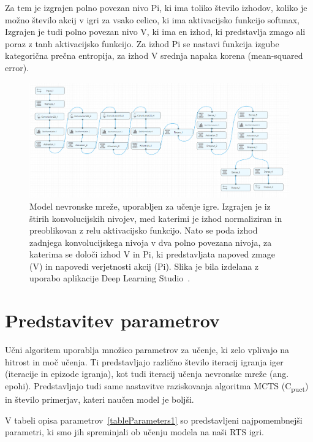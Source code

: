 \documentclass[a4paper, 12pt]{book}
\begin{document}
Za tem je izgrajen polno povezan nivo Pi, ki ima toliko število izhodov, koliko je možno število akcij v igri za vsako celico, ki ima aktivacijsko funkcijo softmax,
Izgrajen je tudi polno povezan nivo V, ki ima en izhod, ki predstavlja zmago ali poraz z tanh aktivacijsko funkcijo.
Za izhod Pi se nastavi funkcija izgube kategorična prečna entropija, za izhod V  srednja napaka korena (mean-squared error).

\begin{figure}[h]
	\begin{center}
		\includegraphics[width=1\textwidth]{photos/model_using_deepcognition.pdf}
	\end{center}
	\caption{Model nevronske mreže, uporabljen za učenje igre. Izgrajen je iz štirih konvolucijskih nivojev, med katerimi je izhod normaliziran in preoblikovan z relu aktivacijsko funkcijo. 
		Nato se poda izhod zadnjega konvolucijskega nivoja v dva polno povezana nivoja, za katerima se določi izhod V in Pi, ki predstavljata napoved zmage (V) in napovedi verjetnosti akcij (Pi).
		Slika je bila izdelana z uporabo aplikacije Deep Learning Studio~\cite{deepcognition}.}
	\label{vizualzacijaModela}
\end{figure}



\section{Predstavitev parametrov}
\label{parametri}
Učni algoritem uporablja množico parametrov za učenje, ki zelo vplivajo na hitrost in moč učenja.
Ti predstavljajo različno število iteracij igranja iger (iteracije in epizode igranja), kot tudi iteracij učenja nevronske mreže (ang. epohi).
Predstavljajo tudi same nastavitve raziskovanja algoritma MCTS (C\textsubscript{puct}) in število primerjav, kateri naučen model je boljši.

V tabeli opisa parametrov~\ref{tableParameters1} so predstavljeni najpomembnejši parametri, ki smo jih spreminjali ob učenju modela na naši RTS igri.
\end{document}
